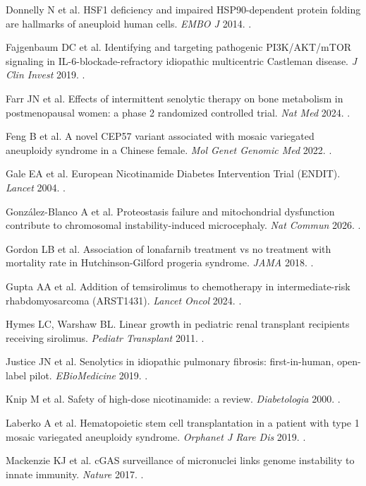 \documentclass[10pt]{article}
\begin{document}
\begin{refs}
\item Donnelly N et al. HSF1 deficiency and impaired HSP90-dependent protein folding are hallmarks of aneuploid human cells. \textit{EMBO J} 2014. .
\item Fajgenbaum DC et al. Identifying and targeting pathogenic PI3K/AKT/mTOR signaling in IL-6-blockade-refractory idiopathic multicentric Castleman disease. \textit{J Clin Invest} 2019. .
\item Farr JN et al. Effects of intermittent senolytic therapy on bone metabolism in postmenopausal women: a phase 2 randomized controlled trial. \textit{Nat Med} 2024. .
\item Feng B et al. A novel CEP57 variant associated with mosaic variegated aneuploidy syndrome in a Chinese female. \textit{Mol Genet Genomic Med} 2022. .
\item Gale EA et al. European Nicotinamide Diabetes Intervention Trial (ENDIT). \textit{Lancet} 2004. .
\item González-Blanco A et al. Proteostasis failure and mitochondrial dysfunction contribute to chromosomal instability-induced microcephaly. \textit{Nat Commun} 2026. .
\item Gordon LB et al. Association of lonafarnib treatment vs no treatment with mortality rate in Hutchinson-Gilford progeria syndrome. \textit{JAMA} 2018. .
\item Gupta AA et al. Addition of temsirolimus to chemotherapy in intermediate-risk rhabdomyosarcoma (ARST1431). \textit{Lancet Oncol} 2024. .
\item Hymes LC, Warshaw BL. Linear growth in pediatric renal transplant recipients receiving sirolimus. \textit{Pediatr Transplant} 2011. .
\item Justice JN et al. Senolytics in idiopathic pulmonary fibrosis: first-in-human, open-label pilot. \textit{EBioMedicine} 2019. .
\item Knip M et al. Safety of high-dose nicotinamide: a review. \textit{Diabetologia} 2000. .
\item Laberko A et al. Hematopoietic stem cell transplantation in a patient with type 1 mosaic variegated aneuploidy syndrome. \textit{Orphanet J Rare Dis} 2019. .
\item Mackenzie KJ et al. cGAS surveillance of micronuclei links genome instability to innate immunity. \textit{Nature} 2017. .

\end{refs}
\end{document}
